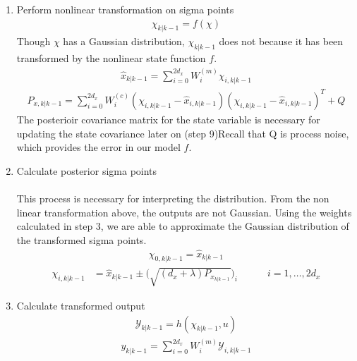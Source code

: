 \begin{enumerate}
        \item Perform nonlinear transformation on sigma points
        \begin{align*}
        \chi_{k | k - 1} = f(\chi)
        \end{align*}
        Though $\chi$ has a Gaussian distribution,  $ \chi_{k | k - 1} $ does not because it has been transformed by the nonlinear state function $f$.
        \begin{align*}
        \hat x_{k | k-1} = \sum^{2d_x}_{i = 0} W_i^{(m)} \chi_{i, k | k - 1}
        \end{align*}
        \begin{align*}
        P_{x, k | k-1} = \sum^{2d_x}_{i = 0} W_i^{(c)} (\chi_{i, k | k - 1} -  \hat x_{i, k | k - 1} )(\chi_{i, k | k - 1} -  \hat x_{i, k | k - 1} )^T + Q
        \end{align*} 
        The posterioir covariance matrix for the state variable is necessary for updating the state covariance later on (step 9)Recall that Q is process noise, which provides the error in our model $f$.
        \item Calculate posterior sigma points \\ \\
        This process is necessary for interpreting the distribution. From the non linear transformation above, the outputs are not Gaussian. Using the weights calculated in step 3, we are able to approximate the Gaussian distribution of the transformed sigma points.
         \begin{align*}
        \chi_{0, k|k-1} = \hat x_{k|k-1}
        \end{align*}
         \begin{align*}
        \chi_{ i,k |k-1} &= \hat{x}_{k |k-1} \pm \bigg(\sqrt{(d_{x}+\lambda)P_{x_{k |k-1}}} \bigg)_{i} \quad \quad \quad  i=1,\dots,2d_{x}
        \end{align*}
        
        \item Calculate transformed output 
         \begin{align*}
       \mathcal{Y}_{k|k-1} = h(\chi_{k|k-1}, u) 
       \end{align*}
       \begin{align*}
       y_{k|k-1} = \sum^{2d_x}_{i = 0} W_i^{(m)}  \mathcal{Y}_{i, k | k - 1}
       \end{align*}
       

\end{enumerate}
